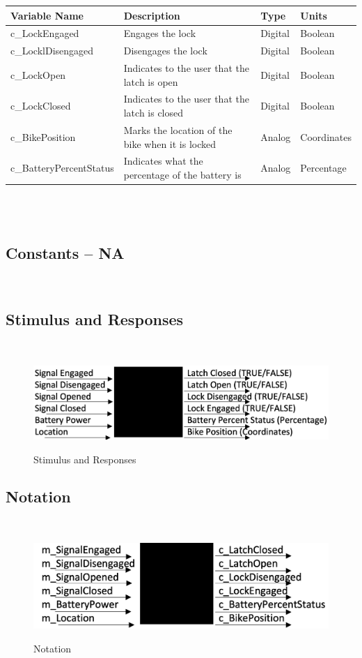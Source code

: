 \documentclass[12pt]{article}
\begin{document}
\begin{minipage}{\textwidth}
\renewcommand*{\arraystretch}{1.5}
\begin{tabular}{| p{} | p{} | p{} | p{} |}
 \hline
 Variable Name & Description & Type & Units \\ 
 \hline
 c\_LockEngaged & Engages the lock & Digital & Boolean \\ 
  \hline
 c\_LocklDisengaged & Disengages the lock & Digital & Boolean \\ 
  \hline
 c\_LockOpen & Indicates to the user that the latch is open & Digital & Boolean \\ 
  \hline
 c\_LockClosed& Indicates to the user that the latch is closed & Digital & Boolean \\ 
  \hline
 c\_BikePosition & Marks the location of the bike when it is locked & Analog & Coordinates \\ 
  \hline
 c\_BatteryPercentStatus & Indicates what the percentage of the battery is & Analog & Percentage \\ 
 \hline
\end{tabular}
\end{minipage}\\
~\newline
\subsection{Constants -- NA}
~\newline
\subsection{Stimulus and Responses}
~\newline
\begin{figure}[h!]
 \begin{center}
 {
 \includegraphics[width=0.6\linewidth]{./StimulusandResponses.jpeg}
 }
 \caption{\label{Stimulus and Responses} Stimulus and Responses}
 \end{center}
 \end{figure}
\subsection{Notation}
~\newline
\begin{figure}[h!]
 \begin{center}
 {
 \includegraphics[width=0.6\linewidth]{./Notation.jpeg}
 }
 \caption{\label{Notation} Notation}
 \end{center}
 \end{figure}
~\newpage
\end{document}
